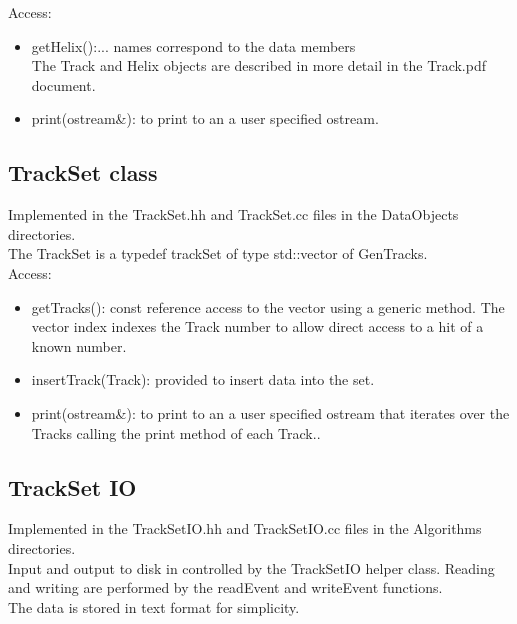 \documentclass[aps,prd,superscriptaddress,floatfix]{revtex4}
\begin{document}
Access:
\begin{itemize}
\item getHelix():... names correspond to the data members\\
The Track and Helix objects are described in more detail in the Track.pdf~\cite{track} document.

\item print(ostream\&): to print to an a user specified ostream.

\end{itemize}


\subsection{TrackSet class}
Implemented in the TrackSet.hh and TrackSet.cc files in the DataObjects directories.
\\

The TrackSet is a typedef trackSet of type std::vector of GenTracks.
\\

Access:
\begin{itemize}
\item getTracks(): const reference access to the vector using a generic method.
The vector index indexes the Track number to allow direct access to a hit of a known number.

\item insertTrack(Track): provided to insert data into the set.


\item print(ostream\&): to print to an a user specified ostream that iterates over
the Tracks calling the print method of each Track..
\end{itemize}


\subsection{TrackSet IO}
Implemented in the TrackSetIO.hh and TrackSetIO.cc files in the Algorithms directories.
\\

Input and output to disk in controlled by the TrackSetIO helper class.  Reading and writing
are performed by the readEvent and writeEvent functions.
\\

The data is stored in text format for simplicity.
\end{document}

